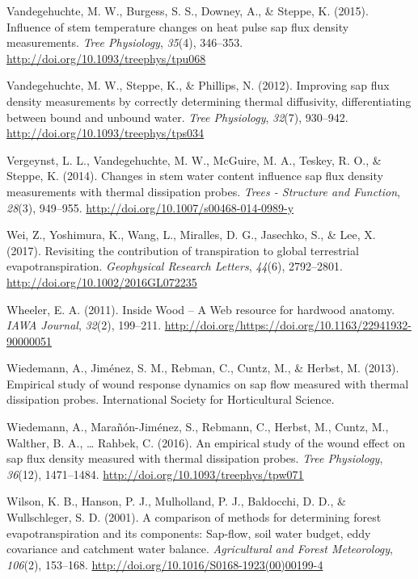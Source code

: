 \documentclass[11pt,twoside]{reedthesis}
\begin{document}
\hypertarget{ref-Vandegehuchte2015}{}
Vandegehuchte, M. W., Burgess, S. S., Downey, A., \& Steppe, K. (2015).
Influence of stem temperature changes on heat pulse sap flux density
measurements. \emph{Tree Physiology}, \emph{35}(4), 346--353.
\url{http://doi.org/10.1093/treephys/tpu068}

\hypertarget{ref-Vandegehuchte2012b}{}
Vandegehuchte, M. W., Steppe, K., \& Phillips, N. (2012). Improving sap
flux density measurements by correctly determining thermal diffusivity,
differentiating between bound and unbound water. \emph{Tree Physiology},
\emph{32}(7), 930--942. \url{http://doi.org/10.1093/treephys/tps034}

\hypertarget{ref-Vergeynst2014}{}
Vergeynst, L. L., Vandegehuchte, M. W., McGuire, M. A., Teskey, R. O.,
\& Steppe, K. (2014). Changes in stem water content influence sap flux
density measurements with thermal dissipation probes. \emph{Trees -
Structure and Function}, \emph{28}(3), 949--955.
\url{http://doi.org/10.1007/s00468-014-0989-y}

\hypertarget{ref-Wei2017}{}
Wei, Z., Yoshimura, K., Wang, L., Miralles, D. G., Jasechko, S., \& Lee,
X. (2017). Revisiting the contribution of transpiration to global
terrestrial evapotranspiration. \emph{Geophysical Research Letters},
\emph{44}(6), 2792--2801. \url{http://doi.org/10.1002/2016GL072235}

\hypertarget{ref-insidewood}{}
Wheeler, E. A. (2011). Inside Wood -- A Web resource for hardwood
anatomy. \emph{IAWA Journal}, \emph{32}(2), 199--211.
\url{http://doi.org/https://doi.org/10.1163/22941932-90000051}

\hypertarget{ref-Wiedemann2013}{}
Wiedemann, A., Jiménez, S. M., Rebman, C., Cuntz, M., \& Herbst, M.
(2013). Empirical study of wound response dynamics on sap flow measured
with thermal dissipation probes. International Society for Horticultural
Science.

\hypertarget{ref-Wiedemann2016}{}
Wiedemann, A., Marañón-Jiménez, S., Rebmann, C., Herbst, M., Cuntz, M.,
Walther, B. A., \ldots{} Rahbek, C. (2016). An empirical study of the
wound effect on sap flux density measured with thermal dissipation
probes. \emph{Tree Physiology}, \emph{36}(12), 1471--1484.
\url{http://doi.org/10.1093/treephys/tpw071}

\hypertarget{ref-Wilson2001}{}
Wilson, K. B., Hanson, P. J., Mulholland, P. J., Baldocchi, D. D., \&
Wullschleger, S. D. (2001). A comparison of methods for determining
forest evapotranspiration and its components: Sap-flow, soil water
budget, eddy covariance and catchment water balance. \emph{Agricultural
and Forest Meteorology}, \emph{106}(2), 153--168.
\url{http://doi.org/10.1016/S0168-1923(00)00199-4}
\end{document}
